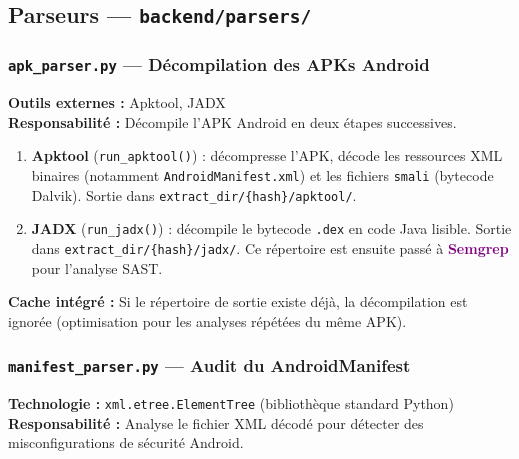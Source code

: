 \documentclass[12pt,a4paper,french]{article}
\newcommand{\tool}[1]{\textcolor{purple}{\textbf{#1}}}
\newcommand{\file}[1]{\textcolor{primary}{\texttt{#1}}}
\begin{document}
\subsection{Parseurs — \file{backend/parsers/}}

\subsubsection{\file{apk\_parser.py} — Décompilation des APKs Android}

\begin{tcolorbox}[toolbox, title={Rôle : Extraction du contenu d'un fichier APK}]
\textbf{Outils externes :} Apktool, JADX\\
\textbf{Responsabilité :} Décompile l'APK Android en deux étapes successives.
\end{tcolorbox}

\begin{enumerate}[leftmargin=1.8cm, itemsep=4pt]
  \item \textbf{Apktool} (\texttt{run\_apktool()}) : décompresse l'APK, décode les ressources
    XML binaires (notamment \texttt{AndroidManifest.xml}) et les fichiers \texttt{smali}
    (bytecode Dalvik). Sortie dans \texttt{extract\_dir/\{hash\}/apktool/}.

  \item \textbf{JADX} (\texttt{run\_jadx()}) : décompile le bytecode \texttt{.dex}
    en code Java lisible. Sortie dans \texttt{extract\_dir/\{hash\}/jadx/}.
    Ce répertoire est ensuite passé à \tool{Semgrep} pour l'analyse SAST.
\end{enumerate}

\textbf{Cache intégré :} Si le répertoire de sortie existe déjà, la décompilation est
ignorée (optimisation pour les analyses répétées du même APK).

\subsubsection{\file{manifest\_parser.py} — Audit du AndroidManifest}

\begin{tcolorbox}[toolbox, title={Rôle : Analyse de sécurité du Manifest Android}]
\textbf{Technologie :} \texttt{xml.etree.ElementTree} (bibliothèque standard Python)\\
\textbf{Responsabilité :} Analyse le fichier XML décodé pour détecter des misconfigurations
de sécurité Android.
\end{tcolorbox}
\end{document}
